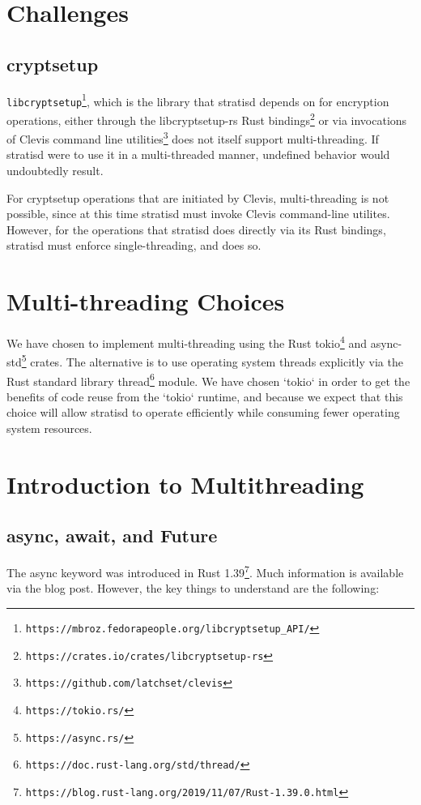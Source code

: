 \documentclass[]{article}
\begin{document}
\section{Challenges}
\subsection{cryptsetup}
\texttt{libcryptsetup}\footnote{\texttt{https://mbroz.fedorapeople.org/libcryptsetup\_API/}}, which is the library that stratisd depends on for encryption operations, either through the libcryptsetup-rs Rust bindings\footnote{\texttt{https://crates.io/crates/libcryptsetup-rs}} or via invocations of Clevis command line utilities\footnote{\texttt{https://github.com/latchset/clevis}} does not itself support multi-threading. If stratisd were to use it in a multi-threaded manner, undefined behavior would undoubtedly result.

For cryptsetup operations that are initiated by Clevis, multi-threading is not possible, since at this time stratisd must invoke Clevis command-line utilites. However, for the operations that stratisd does directly via its Rust bindings, stratisd must enforce single-threading, and does so.

\section{Multi-threading Choices}
We have chosen to implement multi-threading using the Rust tokio\footnote{\texttt{https://tokio.rs/}} and async-std\footnote{\texttt{https://async.rs/}} crates. The alternative is to use operating system threads explicitly via the Rust standard library thread\footnote{\texttt{https://doc.rust-lang.org/std/thread/}} module. We have chosen `tokio` in order to get the benefits of code reuse from the `tokio` runtime, and because we expect that this choice will allow stratisd to operate efficiently while consuming fewer operating system resources.

\section{Introduction to Multithreading}
\subsection{async, await, and Future}

The async keyword was introduced in Rust 1.39\footnote{\texttt{https://blog.rust-lang.org/2019/11/07/Rust-1.39.0.html}}. Much information is available via the blog post. However, the key things to understand are the following:
\end{document}
